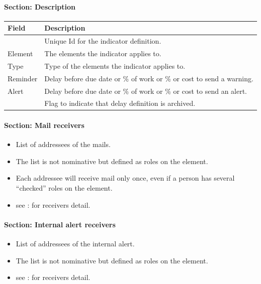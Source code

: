 \documentclass[letterpaper,10pt,english]{sphinxmanual}
\begin{document}
\paragraph{Section: Description}

\begin{tabulary}{\linewidth}{|l|l|}
\hline
\textsf{\relax 
Field
} & \textsf{\relax 
Description
}\\
\hline
{\hyperref[Glossary:term-id]{\emph{}}}
 & 
Unique Id for the indicator definition.
\\
\hline
Element
 & 
The elements the indicator applies to.
\\
\hline
Type
 & 
Type of the elements the indicator applies to.
\\
\hline
Reminder
 & 
Delay before due date or \% of work or \% or cost to send a warning.
\\
\hline
Alert
 & 
Delay before due date or \% of work or \% or cost to send an alert.
\\
\hline
{\hyperref[Glossary:term-closed]{\emph{}}}
 & 
Flag to indicate that delay definition is archived.
\\
\hline\end{tabulary}

\paragraph{Section: Mail receivers}
\begin{itemize}
\item {} 
List of addressees of the mails.

\item {} 
The list is not nominative but defined as roles on the element.

\item {} 
Each addressee will receive mail only once, even if a person has several “checked” roles on the element.

\item {} 
see : {\hyperref[ControlAutomation:ctrlauto-msg-receivers]{\emph{}}} for receivers detail.

\end{itemize}
\paragraph{Section: Internal alert receivers}
\begin{itemize}
\item {} 
List of addressees of the internal alert.

\item {} 
The list is not nominative but defined as roles on the element.

\item {} 
see : {\hyperref[ControlAutomation:ctrlauto-msg-receivers]{\emph{}}} for receivers detail.

\end{itemize}
\newpage
{}
\end{document}
